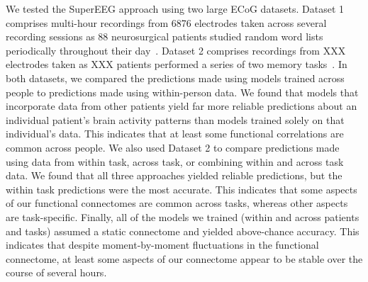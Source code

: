 \documentclass[12pt]{article}
\begin{document}
We tested the SuperEEG approach using two large ECoG datasets. Dataset 1 comprises multi-hour recordings from 6876 electrodes taken across several recording sessions as 88 neurosurgical patients studied random word lists periodically throughout their day~\cite{SedeEtal03, SedeEtal07a,
  SedeEtal07b, MannEtal11, MannEtal12}.  Dataset 2 comprises recordings from XXX electrodes taken as XXX patients performed a series of two memory tasks~\citep{EzzyEtal17, HoraEtal17, KragEtal17, KuceEtal17, LinEtal17, SoloEtal18, WeidEtal18, EzzyEtal18, KuceEtal18}.  In both datasets, 
  we compared the predictions made using models trained across people to predictions made using within-person data.  We found that models that incorporate data from other patients yield far more reliable predictions about an individual patient's brain activity patterns than models trained solely on that individual's data.  This indicates that at least some functional correlations are common across people.  We also used Dataset 2 to compare predictions made using data from within task, across task, or combining within and across task data.  We found that all three approaches yielded reliable predictions, but the within task predictions were the most accurate.  This indicates that some aspects of our functional connectomes are common across tasks, whereas other aspects are task-specific.  Finally, all of the models we trained (within and across patients and tasks) assumed a static connectome and yielded above-chance accuracy.  This indicates that despite moment-by-moment fluctuations in the functional connectome, at least some aspects of our connectome appear to be stable over the course of several hours.
\end{document}
